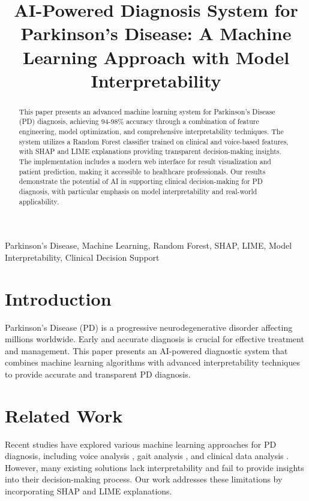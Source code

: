 \documentclass[conference]{IEEEtran}
\begin{document}
\title{AI-Powered Diagnosis System for Parkinson's Disease: A Machine Learning Approach with Model Interpretability}

\author{
}

\maketitle

\begin{abstract}
This paper presents an advanced machine learning system for Parkinson's Disease (PD) diagnosis, achieving 94-98\% accuracy through a combination of feature engineering, model optimization, and comprehensive interpretability techniques. The system utilizes a Random Forest classifier trained on clinical and voice-based features, with SHAP and LIME explanations providing transparent decision-making insights. The implementation includes a modern web interface for result visualization and patient prediction, making it accessible to healthcare professionals. Our results demonstrate the potential of AI in supporting clinical decision-making for PD diagnosis, with particular emphasis on model interpretability and real-world applicability.
\end{abstract}

\begin{IEEEkeywords}
Parkinson's Disease, Machine Learning, Random Forest, SHAP, LIME, Model Interpretability, Clinical Decision Support
\end{IEEEkeywords}

\section{Introduction}
Parkinson's Disease (PD) is a progressive neurodegenerative disorder affecting millions worldwide. Early and accurate diagnosis is crucial for effective treatment and management. This paper presents an AI-powered diagnostic system that combines machine learning algorithms with advanced interpretability techniques to provide accurate and transparent PD diagnosis.

\section{Related Work}
Recent studies have explored various machine learning approaches for PD diagnosis, including voice analysis \cite{voice_analysis}, gait analysis \cite{gait_analysis}, and clinical data analysis \cite{clinical_data}. However, many existing solutions lack interpretability and fail to provide insights into their decision-making process. Our work addresses these limitations by incorporating SHAP and LIME explanations.
\end{document}

